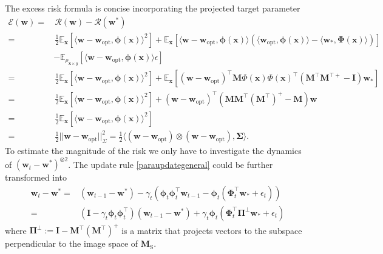 \documentclass{article}
\theoremstyle{definition}
\theoremstyle{definition}
\theoremstyle{plain}
\theoremstyle{plain}
\theoremstyle{plain}
\theoremstyle{plain}
\theoremstyle{plain}
\newcommand{\bs}[1]{\boldsymbol{\mathbf{#1}}}
\newcommand{\mc}[1]{{\mathcal{#1}}}
\newcommand{\Ex}{\mathbb{E}}
\newcommand{\vecx}{\mathbf{x}}
\newcommand{\st}{\mathrm{S}}
\newcommand{\opt}{\mathrm{opt}}
\newcommand{\M}{\mathbf{M}}
\newcommand{\w}{\mathbf{w}}
\newcommand{\id}{\mathbf{I}}
\begin{document}
The excess risk formula is concise incorporating the projected target parameter
\begin{equation}\label{generalexcessriskcomputation}
\begin{aligned}
    \mc E(\w) =& \,\mc R(\w) - \mc R(\w^*)\\
          =&\,\frac{1}{2}\Ex_\vecx\left[\langle \w -\w_{\opt },\bs\phi (\vecx)\rangle^2\right]+\Ex_\vecx\left[\langle \w -\w_{\opt },\bs\phi (\vecx)\rangle\left(\langle \w_{\opt },\bs\phi (\vecx)\rangle - \langle\w_*,\bs\Phi(\vecx)\rangle\right)\right]\\
          \ & - \Ex_{\rho_{\vecx\times y}}[\langle \w -\w_{\opt },\bs\phi (\vecx)\rangle\epsilon]\\
        =& \,\frac{1}{2}\Ex_\vecx\left[\langle \w -\w_{\opt },\bs\phi (\vecx)\rangle^2\right]+\Ex_\vecx\left[ (\w -\w_{\opt })^\top\M  \Phi(\vecx)\Phi(\vecx)^\top(\M ^\top\M ^{\top +}-\id) \w_* \right]\\
        =&\, \frac{1}{2}\Ex_\vecx\left[\langle \w -\w_{\opt },\bs\phi (\vecx)\rangle^2\right]+(\w -\w_{\opt })^\top(\M  \M ^\top(\M^\top)^+-\M ) \w \\
        =&\, \frac{1}{2}\Ex_\vecx\left[\langle \w -\w_{\opt },\bs\phi (\vecx)\rangle^2\right]\\
        =&\, \frac{1}{2}||\w -\w_{\opt }||_{\Sigma }^2 = \frac{1}{2}\langle (\w -\w_{\opt })\otimes(\w -\w_{\opt }),\mathbf{\Sigma} \rangle.
\end{aligned}
\end{equation}
To estimate the magnitude of the risk we only have to investigate the dynamics of $(\w_t-\w^*)^{\otimes2}$. The update rule \ref{paraupdategeneral} could be further transformed into 
\begin{equation}
\begin{aligned}
    \w_{t}-\w^*=& (\w_{t-1}-\w^*)- \gamma_t \left( \bs\phi_{t}\bs\phi_{t}^\top \w_{t-1} - \bs\phi_{t}(\bs\Phi_t^\top \w_* + \epsilon_t) \right)\\
    =& (\id-\gamma_t\bs\phi_t\bs\phi_t^\top)(\w_{t-1}-\w^*)+\gamma_t\bs\phi_t(\bs\Phi_t^\top\bs \Pi^{\perp} \w_*+\epsilon_t)
\end{aligned}
\end{equation}
where $\mathbf{\Pi}^\perp := \id - \M^\top(\M^{\top})^+$ is a matrix that projects vectors to the subspace perpendicular to the image space of $\M_\st$.
\end{document}
